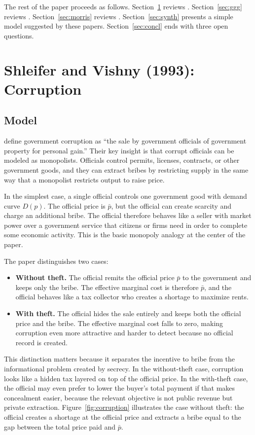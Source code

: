 \documentclass[11pt,letterpaper]{article}
\begin{document}
The rest of the paper proceeds as follows. Section~\ref{sec:sv} reviews \citet{shleifer1993}. Section~\ref{sec:ggg} reviews \citet{galeotti2020}. Section~\ref{sec:morris} reviews \citet{morris2000}. Section~\ref{sec:synth} presents a simple model suggested by these papers. Section~\ref{sec:concl} ends with three open questions.

\section{Shleifer and Vishny (1993): Corruption}
\label{sec:sv}

\subsection{Model}

\citet{shleifer1993} define government corruption as ``the sale by government officials of government property for personal gain.'' Their key insight is that corrupt officials can be modeled as monopolists. Officials control permits, licenses, contracts, or other government goods, and they can extract bribes by restricting supply in the same way that a monopolist restricts output to raise price.

In the simplest case, a single official controls one government good with demand curve $D(p)$. The official price is $\bar{p}$, but the official can create scarcity and charge an additional bribe. The official therefore behaves like a seller with market power over a government service that citizens or firms need in order to complete some economic activity. This is the basic monopoly analogy at the center of the paper.

The paper distinguishes two cases:

\begin{itemize}
    \item \textbf{Without theft.} The official remits the official price $\bar{p}$ to the government and keeps only the bribe. The effective marginal cost is therefore $\bar{p}$, and the official behaves like a tax collector who creates a shortage to maximize rents.
    \item \textbf{With theft.} The official hides the sale entirely and keeps both the official price and the bribe. The effective marginal cost falls to zero, making corruption even more attractive and harder to detect because no official record is created.
\end{itemize}

This distinction matters because it separates the incentive to bribe from the informational problem created by secrecy. In the without-theft case, corruption looks like a hidden tax layered on top of the official price. In the with-theft case, the official may even prefer to lower the buyer's total payment if that makes concealment easier, because the relevant objective is not public revenue but private extraction. Figure~\ref{fig:corruption} illustrates the case without theft: the official creates a shortage at the official price and extracts a bribe equal to the gap between the total price paid and $\bar{p}$.
\end{document}
